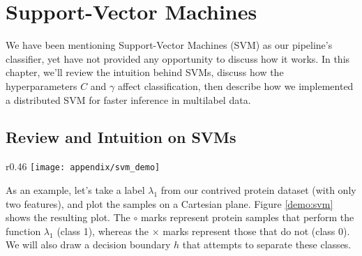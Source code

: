 %
%
%
%
%

\chapter{Support-Vector Machines} 
\label{AppendixDistributed}

\par We have been mentioning Support-Vector Machines (SVM) as our pipeline's
classifier, yet have not provided any opportunity to discuss how it works. In
this chapter, we'll review the intuition behind SVMs, discuss how the
hyperparameters $C$ and $\gamma$ affect classification, then describe how we
implemented a distributed SVM for faster inference in multilabel data.

\section{Review and Intuition on SVMs}

\begin{wrapfigure}{r}{0.46\textwidth}
  \centering
    \texttt{[image: appendix/svm\_demo]}
    \caption{Margin intuition for SVMs}
  \label{demo:svm}
\end{wrapfigure}

\par As an example, let's take a label $\lambda_1$ from our contrived protein
dataset (with only two features), and plot the samples on a Cartesian plane.
Figure \ref{demo:svm} shows the resulting plot.  The $\circ$ marks
represent protein samples that perform the function $\lambda_1$ (class 1),
whereas the $\times$ marks represent those that do not (class 0). We will also
draw a decision boundary $h$ that attempts to separate these classes.

